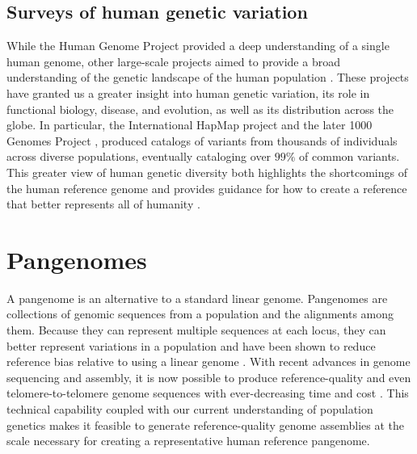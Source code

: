 \documentclass[11pt]{ucscthesis}
\begin{document}
\subsection{Surveys of human genetic variation}

While the Human Genome Project provided a deep understanding of a single human genome, other large-scale projects aimed to provide a broad understanding of the genetic landscape of the human population \cite{international_hapmap_consortium_international_2003,international2005haplotype,1000_genomes_project_consortium_map_2010,1000gp_2015,chaisson_sv_2019}.
These projects have granted us a greater insight into human genetic variation, its role in functional biology, disease, and evolution, as well as its distribution across the globe.
In particular, the International HapMap project \cite{international_hapmap_consortium_international_2003,international2005haplotype} and the later 1000 Genomes Project \cite{1000_genomes_project_consortium_map_2010,1000gp_2015}, produced catalogs of variants from thousands of individuals across diverse populations, eventually cataloging over $99\%$ of common variants.
This greater view of human genetic diversity both highlights the shortcomings of the human reference genome and provides guidance for how to create a reference that better represents all of humanity \cite{ballouz_is_2019,miga_need_pangenome_2021}.


\section{Pangenomes}
\label{sec:background:pangenomes}

A pangenome is an alternative to a standard linear genome.
Pangenomes are collections of genomic sequences from a population and the alignments among them.
Because they can represent multiple sequences at each locus, they can better represent variations in a population and have been shown to reduce reference bias relative to using a linear genome \cite{sherman_pan-genomics_2020,noauthor_computational_2016,hprc_pangenome_2023}.
With recent advances in genome sequencing and assembly, it is now possible to produce reference-quality and even telomere-to-telomere genome sequences with ever-decreasing time and cost \cite{miga_envisioning_2023}.
This technical capability coupled with our current understanding of population genetics makes it feasible to generate reference-quality genome assemblies at the scale necessary for creating a representative human reference pangenome.
\end{document}
